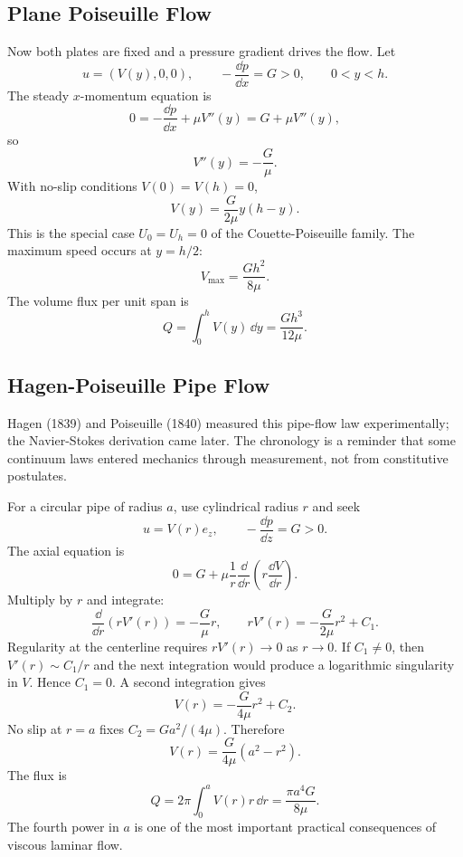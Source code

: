 \subsection{Plane Poiseuille Flow}
\label{subsec:plane-poiseuille}

Now both plates are fixed and a pressure gradient drives the flow. Let
\[
  u=(V(y),0,0),
  \qquad
  -\frac{\dd p}{\dd x}=G>0,
  \qquad
  0<y<h.
\]
The steady \(x\)-momentum equation is
\[
  0=-\frac{\dd p}{\dd x}+\mu V''(y)=G+\mu V''(y),
\]
so
\[
  V''(y)=-\frac{G}{\mu}.
\]
With no-slip conditions \(V(0)=V(h)=0\),
\[
  \boxed{
  V(y)=\frac{G}{2\mu}y(h-y).
  }
\]
This is the special case \(U_0=U_h=0\) of the Couette-Poiseuille family.
The maximum speed occurs at \(y=h/2\):
\[
  V_{\max}=\frac{Gh^2}{8\mu}.
\]
The volume flux per unit span is
\[
  Q=\int_0^h V(y)\,\dd y
  =
  \frac{Gh^3}{12\mu}.
\]

\subsection{Hagen-Poiseuille Pipe Flow}
\label{subsec:hagen-poiseuille}

Hagen (1839) and Poiseuille (1840) measured this pipe-flow law experimentally;
the Navier-Stokes derivation came later. The chronology is a reminder that some
continuum laws entered mechanics through measurement, not from constitutive
postulates.

For a circular pipe of radius \(a\), use cylindrical radius \(r\) and seek
\[
  u=V(r)e_z,\qquad -\frac{\dd p}{\dd z}=G>0.
\]
The axial equation is
\[
  0=G+\mu\frac1r\frac{\dd}{\dd r}
  \left(
    r\frac{\dd V}{\dd r}
  \right).
\]
Multiply by \(r\) and integrate:
\[
  \frac{\dd}{\dd r}\left(rV'(r)\right)
  =
  -\frac{G}{\mu}r,
  \qquad
  rV'(r)=-\frac{G}{2\mu}r^2+C_1.
\]
Regularity at the centerline requires \(rV'(r)\to0\) as \(r\to0\). If
\(C_1\neq0\), then \(V'(r)\sim C_1/r\) and the next integration would produce a
logarithmic singularity in \(V\). Hence \(C_1=0\). A second integration gives
\[
  V(r)=-\frac{G}{4\mu}r^2+C_2.
\]
No slip at \(r=a\) fixes \(C_2=Ga^2/(4\mu)\). Therefore
\[
  \boxed{
  V(r)=\frac{G}{4\mu}(a^2-r^2).
  }
\]
The flux is
\[
  Q=2\pi\int_0^a V(r)r\,\dd r
  =
  \boxed{\frac{\pi a^4G}{8\mu}}.
\]
The fourth power in \(a\) is one of the most important practical consequences
of viscous laminar flow.


